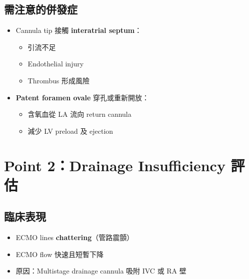 \documentclass[12pt,a4paper]{article}
\begin{document}
\subsection{需注意的併發症}

\begin{itemize}
    \item Cannula tip 接觸 \textbf{interatrial septum}：
    \begin{itemize}
        \item 引流不足
        \item Endothelial injury
        \item Thrombus 形成風險
    \end{itemize}
    \item \textbf{Patent foramen ovale} 穿孔或重新開放：
    \begin{itemize}
        \item 含氧血從 LA 流向 return cannula
        \item 減少 LV preload 及 ejection
    \end{itemize}
\end{itemize}


\section{Point 2：Drainage Insufficiency 評估}

\subsection{臨床表現}

\begin{itemize}
    \item ECMO lines \textbf{chattering}（管路震顫）
    \item ECMO flow 快速且短暫下降
    \item 原因：Multistage drainage cannula 吸附 IVC 或 RA 壁
\end{itemize}
\end{document}
